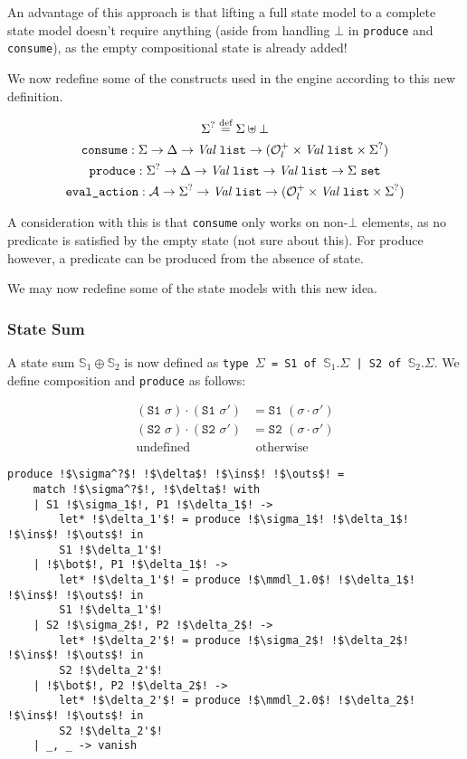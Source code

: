 \documentclass[,a4paper,oneside]{article}
\newcommand{\code}[1]{\texttt{#1}}
\newcommand{\defeq}{\stackrel{\text{def}}=}
\newcommand{\mmdl}{\ensuremath{\mathbb S}}
\newcommand{\rarr}{\ensuremath{\rightarrow}}
\begin{document}
An advantage of this approach is that lifting a full state model to a complete state model doesn't require anything (aside from handling $\bot$ in \code{produce} and \code{consume}), as the empty compositional state is already added!

We now redefine some of the constructs used in the engine according to this new definition.

\newcommand{\vallist}[0]{\textit{Val}~\code{list}}

\begin{gather*}
	\Sigma^? \defeq \Sigma \uplus \bot\\
	\code{consume}:\Sigma \rarr \Delta \rarr \vallist \rarr (\mathcal O^+_l \times \vallist \times \Sigma^?) \\
	\code{produce}:\Sigma^? \rarr \Delta \rarr \vallist \rarr \vallist \rarr \Sigma~\code{set}\\
	\code{eval\_action}: {\cal A} \rarr \Sigma^? \rarr \vallist \rarr (\mathcal O^+_l \times \vallist \times \Sigma^?)
\end{gather*}

A consideration with this is that \code{consume} only works on non-$\bot$ elements, as no predicate is satisfied by the empty state (not sure about this). For produce however, a predicate can be produced from the absence of state.

We may now redefine some of the state models with this new idea.

\subsubsection{State Sum}

A state sum $\mathbb S_1 \oplus \mathbb S_2$ is now defined as \code{type $\Sigma$ = S1 of $\mathbb S_1.\Sigma$ | S2 of $\mathbb S_2.\Sigma$}. We define composition and \code{produce} as follows:

\begin{align*}
	(\code{S1 }\sigma)\cdot(\code{S1 }\sigma') &= \code{S1 }(\sigma\cdot\sigma')\\
	(\code{S2 }\sigma)\cdot(\code{S2 }\sigma') &= \code{S2 }(\sigma\cdot\sigma')\\
	\text{undefined}&\text{ otherwise}
\end{align*}

\begin{verbatim}
produce !$\sigma^?$! !$\delta$! !$\ins$! !$\outs$! =
	match !$\sigma^?$!, !$\delta$! with
	| S1 !$\sigma_1$!, P1 !$\delta_1$! -> 
		let* !$\delta_1'$! = produce !$\sigma_1$! !$\delta_1$! !$\ins$! !$\outs$! in
		S1 !$\delta_1'$!
	| !$\bot$!, P1 !$\delta_1$! ->
		let* !$\delta_1'$! = produce !$\mmdl_1.0$! !$\delta_1$! !$\ins$! !$\outs$! in
		S1 !$\delta_1'$!
	| S2 !$\sigma_2$!, P2 !$\delta_2$! -> 
		let* !$\delta_2'$! = produce !$\sigma_2$! !$\delta_2$! !$\ins$! !$\outs$! in
		S2 !$\delta_2'$!
	| !$\bot$!, P2 !$\delta_2$! -> 
		let* !$\delta_2'$! = produce !$\mmdl_2.0$! !$\delta_2$! !$\ins$! !$\outs$! in
		S2 !$\delta_2'$!
	| _, _ -> vanish
\end{verbatim}
\end{document}
